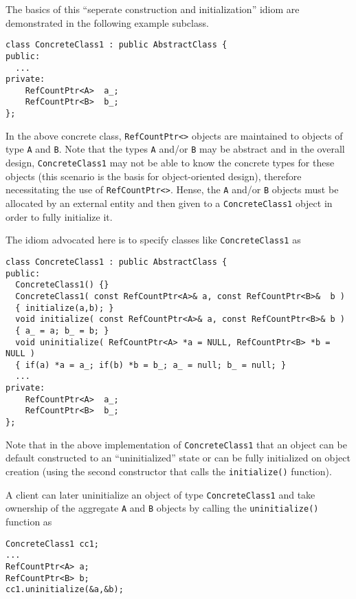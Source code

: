 The basics of this ``seperate construction and initialization'' idiom
are demonstrated in the following example subclass.

{\scriptsize\begin{verbatim}
class ConcreteClass1 : public AbstractClass {
public:
  ...
private:
    RefCountPtr<A>  a_;
    RefCountPtr<B>  b_;
};
\end{verbatim}}

{}\noindent{}In the above concrete class, {}\texttt{RefCountPtr<>}
objects are maintained to objects of type {}\texttt{A} and
{}\texttt{B}.  Note that the types {}\texttt{A} and/or {}\texttt{B}
may be abstract and in the overall design, {}\texttt{ConcreteClass1}
may not be able to know the concrete types for these objects (this
scenario is the basis for object-oriented design), therefore
necessitating the use of {}\texttt{RefCountPtr<>}.  Hense, the
{}\texttt{A} and/or {}\texttt{B} objects must be allocated by an
external entity and then given to a {}\texttt{ConcreteClass1} object
in order to fully initialize it.

The idiom advocated here is to specify classes like
{}\texttt{ConcreteClass1} as
%
{\scriptsize\begin{verbatim}
class ConcreteClass1 : public AbstractClass {
public:
  ConcreteClass1() {}
  ConcreteClass1( const RefCountPtr<A>& a, const RefCountPtr<B>&  b )
  { initialize(a,b); }
  void initialize( const RefCountPtr<A>& a, const RefCountPtr<B>& b )
  { a_ = a; b_ = b; }
  void uninitialize( RefCountPtr<A> *a = NULL, RefCountPtr<B> *b = NULL )
  { if(a) *a = a_; if(b) *b = b_; a_ = null; b_ = null; }
  ...
private:
    RefCountPtr<A>  a_;
    RefCountPtr<B>  b_;
};
\end{verbatim}}

Note that in the above implementation of {}\texttt{ConcreteClass1}
that an object can be default constructed to an ``uninitialized''
state or can be fully initialized on object creation (using the second
constructor that calls the {}\texttt{initialize()} function).

A client can later uninitialize an object of type
{}\texttt{Concrete\-Class1} and take ownership of the aggregate
{}\texttt{A} and {}\texttt{B} objects by calling the
{}\texttt{uninitialize()} function as

{\scriptsize\begin{verbatim}
ConcreteClass1 cc1;
...
RefCountPtr<A> a;
RefCountPtr<B> b;
cc1.uninitialize(&a,&b);
\end{verbatim}}

